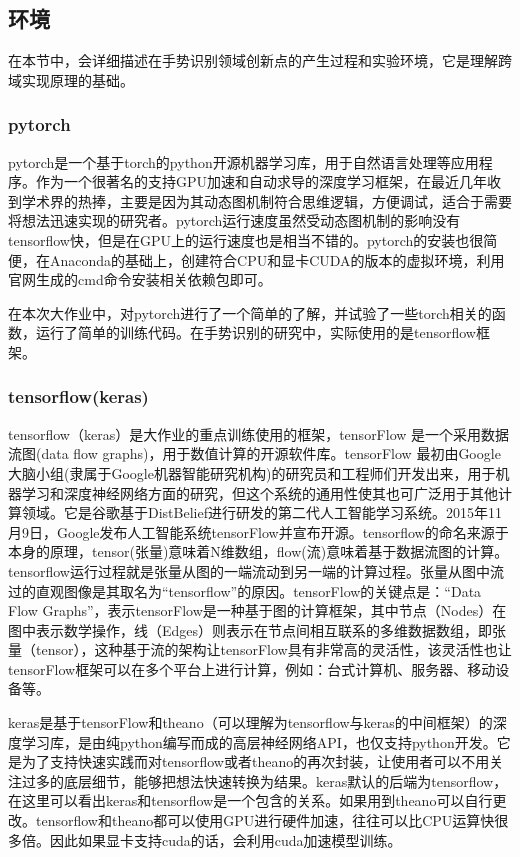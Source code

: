 \documentclass[a4paper]{article}
\begin{document}
  \subsection{环境}
  在本节中，会详细描述在手势识别领域创新点的产生过程和实验环境，它是理解跨域实现原理的基础。
  \subsubsection{pytorch}
  pytorch是一个基于torch的python开源机器学习库，用于自然语言处理等应用程序。作为一个很著名的支持GPU加速和自动求导的深度学习框架，在最近几年收到学术界的热捧，主要是因为其动态图机制符合思维逻辑，方便调试，适合于需要将想法迅速实现的研究者。pytorch运行速度虽然受动态图机制的影响没有tensorflow快，但是在GPU上的运行速度也是相当不错的。pytorch的安装也很简便，在Anaconda的基础上，创建符合CPU和显卡CUDA的版本的虚拟环境，利用官网生成的cmd命令安装相关依赖包即可。 \par
  在本次大作业中，对pytorch进行了一个简单的了解，并试验了一些torch相关的函数，运行了简单的训练代码。在手势识别的研究中，实际使用的是tensorflow框架。
  \subsubsection{tensorflow(keras)}
  tensorflow（keras）是大作业的重点训练使用的框架，tensorFlow 是一个采用数据流图(data flow graphs)，用于数值计算的开源软件库。tensorFlow 最初由Google大脑小组(隶属于Google机器智能研究机构)的研究员和工程师们开发出来，用于机器学习和深度神经网络方面的研究，但这个系统的通用性使其也可广泛用于其他计算领域。它是谷歌基于DistBelief进行研发的第二代人工智能学习系统。2015年11月9日，Google发布人工智能系统tensorFlow并宣布开源。tensorflow的命名来源于本身的原理，tensor(张量)意味着N维数组，flow(流)意味着基于数据流图的计算。tensorflow运行过程就是张量从图的一端流动到另一端的计算过程。张量从图中流过的直观图像是其取名为“tensorflow”的原因。tensorFlow的关键点是：“Data Flow Graphs”，表示tensorFlow是一种基于图的计算框架，其中节点（Nodes）在图中表示数学操作，线（Edges）则表示在节点间相互联系的多维数据数组，即张量（tensor），这种基于流的架构让tensorFlow具有非常高的灵活性，该灵活性也让tensorFlow框架可以在多个平台上进行计算，例如：台式计算机、服务器、移动设备等。 \par
  keras是基于tensorFlow和theano（可以理解为tensorflow与keras的中间框架）的深度学习库，是由纯python编写而成的高层神经网络API，也仅支持python开发。它是为了支持快速实践而对tensorflow或者theano的再次封装，让使用者可以不用关注过多的底层细节，能够把想法快速转换为结果。keras默认的后端为tensorflow，在这里可以看出keras和tensorflow是一个包含的关系。如果用到theano可以自行更改。tensorflow和theano都可以使用GPU进行硬件加速，往往可以比CPU运算快很多倍。因此如果显卡支持cuda的话，会利用cuda加速模型训练。
\end{document}
